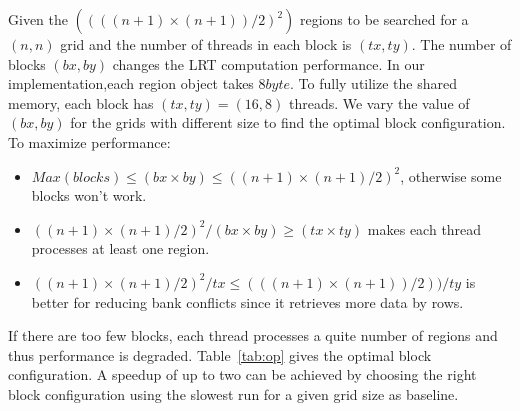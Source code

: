 \documentclass[AMA,LATO1COL]{WileyNJD-v2-bak}
\begin{document}

Given the $((((n+1)\times(n+1))/2)^2)$ regions to be searched for a $(n,n)$ grid and the number of threads in each block is $(tx,ty)$. The number of blocks $(bx,by)$ changes the LRT computation performance. In our implementation,each region object takes $8byte$. To fully utilize the shared memory, each block has $(tx,ty)=(16,8)$ threads. We vary the value of $(bx,by)$ for the grids with different size to find the optimal block configuration. To maximize performance:
\begin{itemize}
\item $Max(blocks)\le (bx\times by)\le ((n+1)\times(n+1)/2)^2$, otherwise some blocks won't work.
\item $((n+1)\times(n+1)/2)^2/(bx\times by)\ge (tx\times ty)$ makes each thread processes at least one region.
\item $((n+1)\times(n+1)/2)^2/tx \le (((n+1)\times(n+1))/2))/ty$ is better for reducing bank conflicts since it retrieves more data by rows.
\end{itemize}
If there are too few blocks, each thread processes a quite number of regions and thus performance is degraded. Table~\ref{tab:op} gives the optimal block configuration. A speedup of up to two can be achieved by choosing the right block configuration using the slowest run for a given grid size as baseline.
\end{document}
